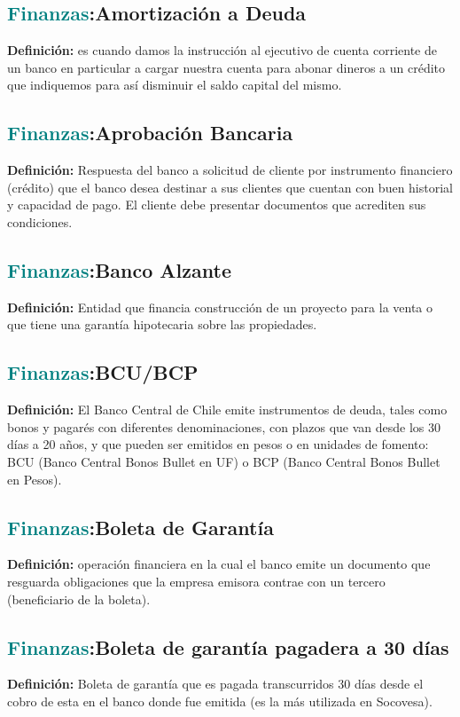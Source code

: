 \documentclass[12pt]{article}
\begin{document}
\subsection{\textcolor{teal}{Finanzas}:{Amortización a Deuda}}
\textbf{Definición:} es cuando damos la instrucción al ejecutivo de cuenta corriente de un banco en particular a cargar nuestra cuenta para abonar dineros a un crédito que indiquemos para así disminuir el saldo capital del mismo. 
\subsection{\textcolor{teal}{Finanzas}:{Aprobación Bancaria}}
\textbf{Definición:} Respuesta del banco a solicitud de cliente por instrumento financiero (crédito) que el banco desea destinar a sus clientes que cuentan con buen historial y capacidad de pago. El cliente debe presentar documentos que acrediten sus condiciones.
\subsection{\textcolor{teal}{Finanzas}:{Banco Alzante}}
\textbf{Definición:} Entidad que financia construcción de un proyecto para la venta o que tiene una garantía hipotecaria sobre las propiedades. 
\subsection{\textcolor{teal}{Finanzas}:{BCU/BCP}}
\textbf{Definición:} El Banco Central de Chile emite instrumentos de deuda, tales como bonos y pagarés con diferentes denominaciones, con plazos que van desde los 30 días a 20 años, y que pueden ser emitidos en pesos o en unidades de fomento: BCU (Banco Central Bonos Bullet en UF) o BCP (Banco Central Bonos Bullet en Pesos).
\subsection{\textcolor{teal}{Finanzas}:{Boleta de Garantía}}
\textbf{Definición:} operación financiera en la cual el banco emite un documento que resguarda obligaciones que la empresa emisora contrae con un tercero (beneficiario de la boleta).
\subsection{\textcolor{teal}{Finanzas}:{Boleta de garantía pagadera a 30 días}}
\textbf{Definición:} Boleta de garantía que es pagada transcurridos 30 días desde el cobro de esta en el banco donde fue emitida (es la más utilizada en Socovesa).
\end{document}

